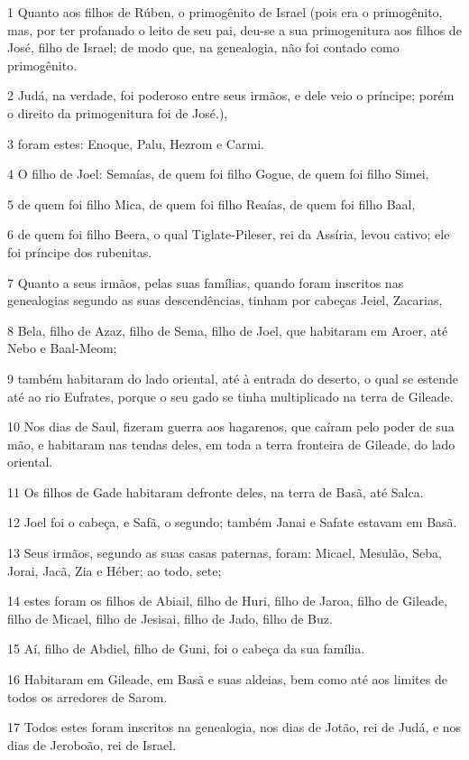 \par 1 Quanto aos filhos de Rúben, o primogênito de Israel (pois era o primogênito, mas, por ter profanado o leito de seu pai, deu-se a sua primogenitura aos filhos de José, filho de Israel; de modo que, na genealogia, não foi contado como primogênito.
\par 2 Judá, na verdade, foi poderoso entre seus irmãos, e dele veio o príncipe; porém o direito da primogenitura foi de José.),
\par 3 foram estes: Enoque, Palu, Hezrom e Carmi.
\par 4 O filho de Joel: Semaías, de quem foi filho Gogue, de quem foi filho Simei,
\par 5 de quem foi filho Mica, de quem foi filho Reaías, de quem foi filho Baal,
\par 6 de quem foi filho Beera, o qual Tiglate-Pileser, rei da Assíria, levou cativo; ele foi príncipe dos rubenitas.
\par 7 Quanto a seus irmãos, pelas suas famílias, quando foram inscritos nas genealogias segundo as suas descendências, tinham por cabeças Jeiel, Zacarias,
\par 8 Bela, filho de Azaz, filho de Sema, filho de Joel, que habitaram em Aroer, até Nebo e Baal-Meom;
\par 9 também habitaram do lado oriental, até à entrada do deserto, o qual se estende até ao rio Eufrates, porque o seu gado se tinha multiplicado na terra de Gileade.
\par 10 Nos dias de Saul, fizeram guerra aos hagarenos, que caíram pelo poder de sua mão, e habitaram nas tendas deles, em toda a terra fronteira de Gileade, do lado oriental.
\par 11 Os filhos de Gade habitaram defronte deles, na terra de Basã, até Salca.
\par 12 Joel foi o cabeça, e Safã, o segundo; também Janai e Safate estavam em Basã.
\par 13 Seus irmãos, segundo as suas casas paternas, foram: Micael, Mesulão, Seba, Jorai, Jacã, Zia e Héber; ao todo, sete;
\par 14 estes foram os filhos de Abiail, filho de Huri, filho de Jaroa, filho de Gileade, filho de Micael, filho de Jesisai, filho de Jado, filho de Buz.
\par 15 Aí, filho de Abdiel, filho de Guni, foi o cabeça da sua família.
\par 16 Habitaram em Gileade, em Basã e suas aldeias, bem como até aos limites de todos os arredores de Sarom.
\par 17 Todos estes foram inscritos na genealogia, nos dias de Jotão, rei de Judá, e nos dias de Jeroboão, rei de Israel.
